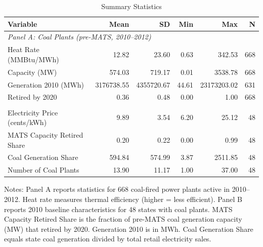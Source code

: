 \begin{table}[H]
\centering
\caption{Summary Statistics}
\begin{threeparttable}
\begin{tabular}{lrrrrr}
\toprule
Variable & Mean & SD & Min & Max & N \\
\midrule
\multicolumn{6}{l}{\textit{Panel A: Coal Plants (pre-MATS, 2010--2012)}} \\
\addlinespace
Heat Rate (MMBtu/MWh) & 12.82 & 23.60 & 0.63 & 342.53 & 668 \\
Capacity (MW) & 574.03 & 719.17 & 0.01 & 3538.78 & 668 \\
Generation 2010 (MWh) & 3176738.55 & 4355720.67 & 44.61 & 23173203.02 & 631 \\
Retired by 2020 & 0.36 & 0.48 & 0.00 & 1.00 & 668 \\
\addlinespace
\multicolumn{6}{l}{\textit{Panel B: States with Coal Plants (2010 baseline)}} \\
\addlinespace
Electricity Price (cents/kWh) & 9.89 & 3.54 & 6.20 & 25.12 & 48 \\
MATS Capacity Retired Share & 0.20 & 0.22 & 0.00 & 0.99 & 48 \\
Coal Generation Share & 594.84 & 574.99 & 3.87 & 2511.85 & 48 \\
Number of Coal Plants & 13.90 & 11.17 & 1.00 & 37.00 & 48 \\
\bottomrule
\end{tabular}
\begin{tablenotes}[flushleft]
\small
\item Notes: Panel A reports statistics for 668 coal-fired power plants active in 2010--2012. Heat rate measures thermal efficiency (higher = less efficient). Panel B reports 2010 baseline characteristics for 48 states with coal plants. MATS Capacity Retired Share is the fraction of pre-MATS coal generation capacity (MW) that retired by 2020. Generation 2010 is in MWh. Coal Generation Share equals state coal generation divided by total retail electricity sales.
\end{tablenotes}
\end{threeparttable}
\label{tab:summary}
\end{table}
